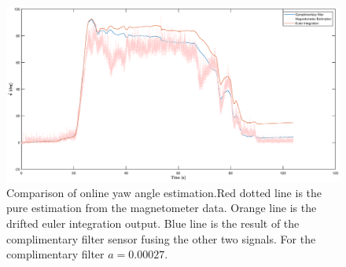 \begin{figure}
    \centering
    \includegraphics[width=\textwidth]{images/figureB_3.eps}
    \caption{Comparison of online yaw angle estimation.Red dotted line is the pure estimation from the magnetometer data. Orange line is the drifted euler integration output. Blue line is the result of the complimentary filter sensor fusing the other two signals. For the complimentary filter \ensuremath{a=0.00027}.}
\end{figure}